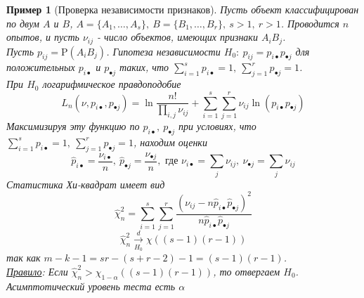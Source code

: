 \documentclass[12pt]{article}
\newtheorem*{example}{Пример}
\theoremstyle{basic_theorem}
\theoremstyle{name_theorem}
\def\P{ \mathrm{P} }
\begin{document}
    \begin{example}[Проверка независимости признаков]
        Пусть объект классифицирован по двум $A$ и $B$,
        $A=\{A_1,\ldots,A_s\},\ B=\{B_1,\ldots,B_r\},\ s>1,\ r>1$.
        Проводится $n$ опытов, и пусть $\nu_{ij}$ - число объектов,
        имеющих признаки $A_iB_j$. \\
        Пусть $p_{ij}=\P(A_iB_j)$. Гипотеза независимости
        $H_0:\ p_{ij}=p_{i\bullet}p_{\bullet j}$ для положительных $p_{i\bullet}$ и $p_{\bullet j}$
        таких, что $\sum_{i=1}^sp_{i\bullet}=1,\ \sum_{j=1}^rp_{\bullet j}=1$. \\
        При $H_0$ логарифмическое правдоподобие
        \[L_n(\nu,p_{i\bullet},p_{\bullet j})=\ln\frac{n!}{\prod_{i,j}\nu_{ij}}+\sum_{i=1}^s\sum_{j=1}^r\nu_{ij}\ln(p_{i\bullet}p_{\bullet j})\]
        Максимизируя эту функцию по $p_{i\bullet},\ p_{\bullet j}$ при условиях, что $\sum_{i=1}^sp_{i\bullet}=1,\ \sum_{j=1}^rp_{\bullet j}=1$,
        находим оценки
        \[\widehat{p}_{i\bullet}=\frac{\nu_{i\bullet}}{n},\ \widehat{p}_{\bullet j}=\frac{\nu_{\bullet j}}{n},\text{ где } \nu_{i\bullet}=\sum_{j}\nu_{ij},\ \nu_{\bullet j}=\sum_{j}\nu_{ij}\]
        Статистика Хи-квадрат имеет вид
        \[\widehat{\chi}_n^2=\sum_{i=1}^s\sum_{j=1}^r\frac{(\nu_{ij}-n\widehat{p}_{i\bullet}\widehat{p}_{\bullet j})^2}{n\widehat{p}_{i\bullet}\widehat{p}_{\bullet j}}\]
        \[\widehat{\chi}_n^2\xrightarrow[H_0]{d}\chi((s-1)(r-1))\]
        так как $m-k-1=sr-(s+r-2)-1=(s-1)(r-1)$. \\
        \underline{Правило}: Если $\widehat{\chi}_n^2>\chi_{1-\alpha}((s-1)(r-1))$,
        то отвергаем $H_0$. Асимптотический уровень теста есть $\alpha$
    \end{example}
\end{document}
